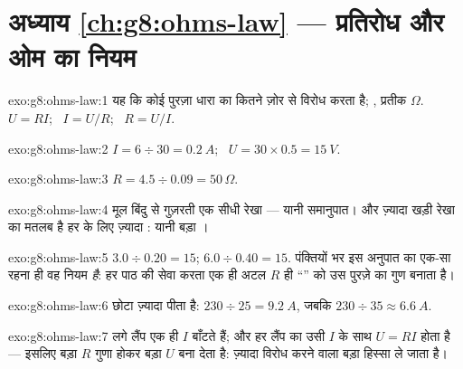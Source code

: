 \section*{अध्याय \ref{ch:g8:ohms-law} --- प्रतिरोध और ओम का नियम}

\begin{solution}{exo:g8:ohms-law:1}
यह कि कोई पुरज़ा धारा का कितने ज़ोर से विरोध करता है;  ,
प्रतीक $\Omega$. $U = R I$; \ $I = U/R$; \ $R = U/I$.
\end{solution}

\begin{solution}{exo:g8:ohms-law:2}
$I = 6 \div 30 = \qty{0.2}{A}$; \ $U = 30 \times 0.5 =
\qty{15}{V}$.
\end{solution}

\begin{solution}{exo:g8:ohms-law:3}
$R = 4.5 \div 0.09 = 50\,\Omega$.
\end{solution}

\begin{solution}{exo:g8:ohms-law:4}
मूल बिंदु से गुज़रती एक सीधी रेखा --- यानी समानुपात। और ज़्यादा खड़ी
रेखा का मतलब है हर  के लिए ज़्यादा : यानी बड़ा ।
\end{solution}

\begin{solution}{exo:g8:ohms-law:5}
$3.0 \div 0.20 = 15$; $6.0 \div 0.40 = 15$. पंक्तियों भर इस अनुपात
का एक-सा रहना ही वह नियम \emph{है}: हर पाठ की सेवा करता एक ही अटल $R$
ही ``'' को उस पुरज़े का गुण बनाता है।
\end{solution}

\begin{solution}{exo:g8:ohms-law:6}
छोटा  ज़्यादा पीता है: $230 \div 25 = \qty{9.2}{A}$, जबकि
$230 \div 35 \approx \qty{6.6}{A}$.
\end{solution}

\begin{solution}{exo:g8:ohms-law:7}
 लगे लैंप एक ही $I$ बाँटते हैं; और हर लैंप का  उसी
$I$ के साथ $U = R I$ होता है --- इसलिए बड़ा $R$ गुणा होकर बड़ा $U$ बना
देता है: ज़्यादा विरोध करने वाला बड़ा हिस्सा ले जाता है।
\end{solution}

